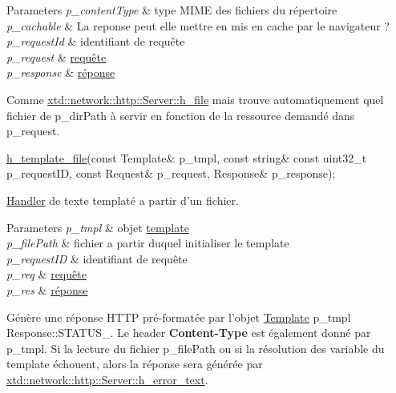 \begin{DoxyItemize}
\begin{DoxyParams}{Parameters}
\hline
{\em p\-\_\-content\-Type} & type M\-I\-M\-E des fichiers du répertoire \\
\hline
{\em p\-\_\-cachable} & La reponse peut elle mettre en mis en cache par le navigateur ? \\
\hline
{\em p\-\_\-request\-Id} & identifiant de requête \\
\hline
{\em p\-\_\-request} & \hyperlink{classxtd_1_1network_1_1http_1_1Request}{requête} \\
\hline
{\em p\-\_\-response} & \hyperlink{classxtd_1_1network_1_1http_1_1Response}{réponse}\\
\hline
\end{DoxyParams}
Comme \hyperlink{classxtd_1_1network_1_1http_1_1Server_a4358a20d2246a84f67d299f385c5bce8}{xtd\-::network\-::http\-::\-Server\-::h\-\_\-file} mais trouve automatiquement quel fichier de p\-\_\-dir\-Path à servir en fonction de la ressource demandé dans p\-\_\-request.
\item 
\begin{DoxyCode}
\hyperlink{classxtd_1_1network_1_1http_1_1Server_a28cc571d0a2e9a88abde8da286ad6a77}{h\_template\_file}(\textcolor{keyword}{const} Template& p\_tmpl, \textcolor{keyword}{const} \textcolor{keywordtype}{string}& \textcolor{keyword}{const} uint32\_t p\_requestID, \textcolor{keyword}{const} 
      Request& p\_request, Response& p\_response); 
\end{DoxyCode}
 \hyperlink{classxtd_1_1network_1_1http_1_1Server_1_1Handler}{Handler} de texte templaté a partir d'un fichier. 
\begin{DoxyParams}{Parameters}
{\em p\-\_\-tmpl} & objet \hyperlink{classxtd_1_1network_1_1http_1_1Template}{template} \\
\hline
{\em p\-\_\-file\-Path} & fichier a partir duquel initialiser le template \\
\hline
{\em p\-\_\-request\-I\-D} & identifiant de requête \\
\hline
{\em p\-\_\-req} & \hyperlink{classxtd_1_1network_1_1http_1_1Request}{requête} \\
\hline
{\em p\-\_\-res} & \hyperlink{classxtd_1_1network_1_1http_1_1Response}{réponse}\\
\hline
\end{DoxyParams}
Génère une réponse H\-T\-T\-P pré-\/formatée par l'objet \hyperlink{classxtd_1_1network_1_1http_1_1Template}{Template} p\-\_\-tmpl Response\-::\-S\-T\-A\-T\-U\-S\-\_. Le header {\bfseries Content-\/\-Type} est également donné par p\-\_\-tmpl. Si la lecture du fichier p\-\_\-file\-Path ou si la résolution des variable du template échouent, alors la réponse sera générée par \hyperlink{classxtd_1_1network_1_1http_1_1Server_a39656db929894be1af465c0409c22f35}{xtd\-::network\-::http\-::\-Server\-::h\-\_\-error\-\_\-text}.

\end{DoxyItemize}
